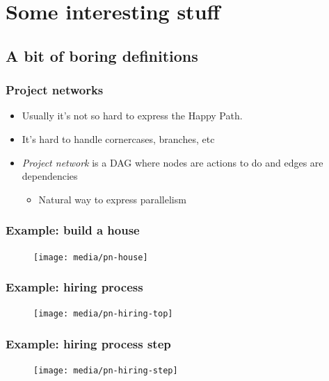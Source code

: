 \documentclass{beamer}
\begin{document}
\section{Some interesting stuff}
\subsection{A bit of boring definitions}

\begin{frame}
    \frametitle{Project networks}
    \begin{itemize}
        \item Usually it's not so hard to express the Happy Path.
        \item It's hard to handle cornercases, branches, etc
        \item \textit{Project network} is a DAG where nodes are actions to do and edges are dependencies
        \begin{itemize}
            \item Natural way to express parallelism         
        \end{itemize}            
    \end{itemize}    
\end{frame}

\begin{frame}
    \frametitle{Example: build a house}
    \begin{figure}
        \texttt{[image: media/pn-house]}
    \end{figure}
\end{frame}


\begin{frame}
    \frametitle{Example: hiring process}
    \begin{figure}
        \texttt{[image: media/pn-hiring-top]}
    \end{figure}
\end{frame}

\begin{frame}
    \frametitle{Example: hiring process step}
    \begin{figure}
        \texttt{[image: media/pn-hiring-step]}
    \end{figure}
\end{frame}
\end{document}
